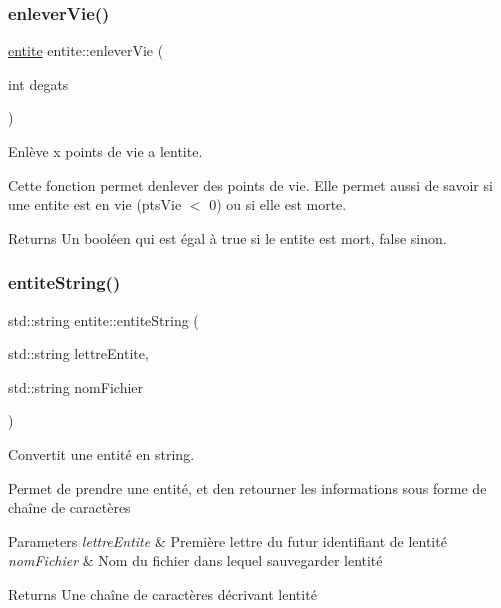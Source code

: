 \subsubsection{\texorpdfstring{enlever\+Vie()}{enleverVie()}}
{\footnotesize\ttfamily \hyperlink{classentite}{entite} entite\+::enlever\+Vie (\begin{DoxyParamCaption}\item[{int}]{degats }\end{DoxyParamCaption})}



Enlève x points de vie a l\textquotesingle{}entite. 

Cette fonction permet d\textquotesingle{}enlever des points de vie. Elle permet aussi de savoir si une entite est en vie (pts\+Vie $<$ 0) ou si elle est morte. \begin{DoxyReturn}{Returns}
Un booléen qui est égal à {\ttfamily true} si le entite est mort, {\ttfamily false} sinon. 
\end{DoxyReturn}
\mbox{\label{classentite_aef8675e5f8592e0cc56661d4d5827d1f}} 
\subsubsection{\texorpdfstring{entite\+String()}{entiteString()}}
{\footnotesize\ttfamily std\+::string entite\+::entite\+String (\begin{DoxyParamCaption}\item[{std\+::string}]{lettre\+Entite,  }\item[{std\+::string}]{nom\+Fichier }\end{DoxyParamCaption})}



Convertit une entité en string. 

Permet de prendre une entité, et d\textquotesingle{}en retourner les informations sous forme de chaîne de caractères 
\begin{DoxyParams}{Parameters}
{\em lettre\+Entite} & Première lettre du futur identifiant de l\textquotesingle{}entité \\
\hline
{\em nom\+Fichier} & Nom du fichier dans lequel sauvegarder l\textquotesingle{}entité \\
\hline
\end{DoxyParams}
\begin{DoxyReturn}{Returns}
Une chaîne de caractères décrivant l\textquotesingle{}entité 
\end{DoxyReturn}
\mbox{\label{classentite_a5a39811eb0c12ae85a23f152c8ba6d58}} 
